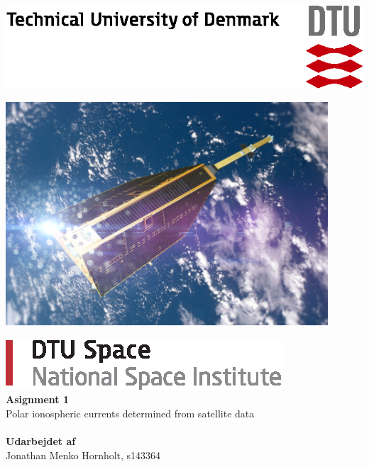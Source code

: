 \begin{titlepage}
	\begin{flushright}
		\includegraphics[scale=0.7]{fig/dtu/dtu_logo}
	\end{flushright}
	\vfill
	\begin{center}
	\includegraphics[width=0.9\textwidth]{fig/CHAMP.png}
	\end{center}
	\vspace{10mm}
	\begin{flushleft}
		\includegraphics{fig/dtu/dtu_space}\\
		\Huge
		\textbf{Asignment 1}\\
		Polar ionospheric currents determined from satellite data\\
		\large
		\makeatletter
        \@date
        \makeatother\\
		\vspace{0.7cm}
		\textbf{Udarbejdet af}\\
		\normalsize
        Jonathan Menko Hornholt, s143364
	\end{flushleft}
\end{titlepage}